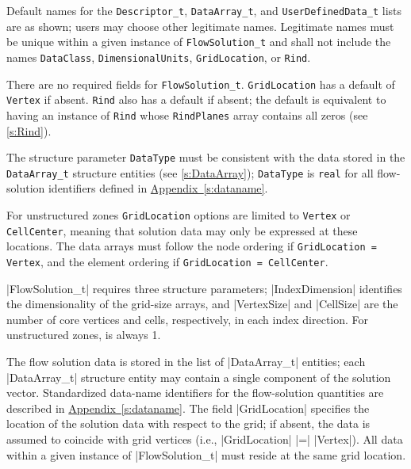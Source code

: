 \begin{notes}
\item Default names for the \texttt{Descriptor\_t},
      \texttt{DataArray\_t}, and \texttt{UserDefinedData\_t} lists are
      as shown; users may choose other legitimate names.
      Legitimate names must be unique within a given instance
      of \texttt{FlowSolution\_t} and shall not include the
      names \texttt{DataClass}, \texttt{DimensionalUnits},
      \texttt{GridLocation}, or \texttt{Rind}.
\item There are no required fields for \texttt{FlowSolution\_t}.
      \texttt{GridLocation} has a default of \texttt{Vertex} if
      absent. \texttt{Rind} also has a default if absent; the
      default is equivalent to having an instance of \texttt{Rind}
      whose \texttt{RindPlanes} array contains all zeros (see
      \autoref{s:Rind}).
\item The structure parameter \texttt{DataType} must be consistent
      with the data stored in the \texttt{DataArray\_t} structure
      entities (see \autoref{s:DataArray}); \texttt{DataType} is
      \texttt{real} for all flow-solution identifiers defined in
      \hyperref[s:dataname]{Appendix~\ref*{s:dataname}}.
\item For unstructured zones \texttt{GridLocation} options are limited
      to \texttt{Vertex} or \texttt{CellCenter}, meaning that solution
      data may only be expressed at these locations.
      The data arrays must follow the node ordering
      if \texttt{GridLocation = Vertex}, and the element ordering if
      \texttt{GridLocation = CellCenter}.
\end{notes}

|FlowSolution_t| requires three structure parameters; |IndexDimension|
identifies the dimensionality of the grid-size arrays, and |VertexSize|
and |CellSize| are the number of core vertices and cells, respectively,
in each index direction.
For unstructured zones,  is always 1.

The flow solution data is stored in the list of |DataArray_t| entities;
each |DataArray_t| structure entity may contain a single component of
the solution vector.
Standardized data-name identifiers for the flow-solution quantities are
described in \hyperref[s:dataname]{Appendix~\ref*{s:dataname}}.
The field |GridLocation| specifies the location of the solution data
with respect to the grid; if absent, the data is assumed to coincide
with grid vertices (i.e., |GridLocation| |=| |Vertex|).
All data within a given instance of |FlowSolution_t| must reside at the
same grid location.

